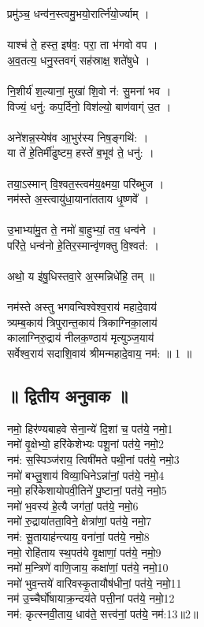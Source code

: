 प्रमु॑ञ्च॒ धन्व॑न॒स्त्वमु॒भयो॒रार्त्नि॑यो॒र्ज्याम् ।\\
\\
याश्च॑ ते॒ हस्त॒ इष॑व॒: परा॒ ता भ॑गवो वप ।\\
अ॒व॒तत्य॒ धनु॒स्तवग्ं सह॑स्राक्ष॒ शते॑षुधे ।\\
\\
नि॒शीर्य॑ श॒ल्यानां॒ मुखा॑ शि॒वो न॑: सु॒मना॑ भव ।\\
विज्यं॒ धनु॑: कप॒र्दिनो॒ विश॑ल्यो॒ बाण॑वाग्ं उ॒त ।\\
\\
अने॑शन्न॒स्येष॑व आ॒भुर॑स्य निष॒ङ्गथि॑: ।\\
या ते॑ हे॒तिर्मी॑ढुष्टम॒ हस्ते॑ ब॒भूव॑ ते॒ धनु॑: ।\\
\\
तया॒ऽस्मान् वि॒श्वत॒स्त्वम॑य॒क्ष्मया॒ परि॑ब्भुज ।\\
नम॑स्ते अ॒स्त्वायु॑धा॒याना॑तताय धृ॒ष्णवे᳚ ।\\
\\
उ॒भाभ्या॑मु॒त ते॒ नमो॑ बा॒हुभ्यां॒ तव॒ धन्व॑ने ।\\
परि॑ते॒ धन्व॑नो हे॒तिर॒स्मान्वृ॑णक्तु वि॒श्वत॑: ।\\
\\
अथो॒ य इ॑षु॒धिस्तवा॒रे अ॒स्मन्निधे॑हि॒ तम् ॥\\
\\
नम॑स्ते अस्तु भगवन्विश्वेश्व॒राय॑ महादे॒वाय॑\\
त्र्यम्ब॒काय॑ त्रिपुरान्त॒काय॑ त्रिकाग्निका॒लाय॑\\
कालाग्निरु॒द्राय॑ नीलक॒ण्ठाय॑ मृत्युञ्ज॒याय॑\\
सर्वेश्व॒राय॑ सदाशि॒वाय॑ श्रीमन्महादे॒वाय॒ नम॑: ॥ 1 ॥\\
\subsection{॥ द्वितीय अनुवाक ॥}
नमो॒ हिर॑ण्यबाहवे सेना॒न्ये॑ दि॒शां च॒ पत॑ये॒ नमो॒{\small 1}\\
नमो॑ वृ॒क्षेभ्यो॒ हरि॑केशेभ्यः पशू॒नां पत॑ये॒ नमो॒{\small 2}\\
नम॑: स॒स्पिञ्ज॑राय॒ त्विषी॑मते पथी॒नां पत॑ये॒ नमो॒{\small 3}\\
नमो॑ बभ्लु॒शाय॑ विव्या॒धिनेऽन्ना॑नां॒ पत॑ये॒ नमो॒{\small 4}\\
नमो॒ हरि॑केशायोपवी॒तिने॑ पु॒ष्टानां॒ पत॑ये॒ नमो॒{\small 5}\\
नमो॑ भ॒वस्य॑ हे॒त्यै जग॑तां॒ पत॑ये॒ नमो॒{\small 6}\\
नमो॑ रु॒द्राया॑तता॒विने॒ क्षेत्रा॑णां॒ पत॑ये॒ नमो॒{\small 7}\\
नम॑: सू॒तायाह॑न्त्याय॒ वना॑नां॒ पत॑ये॒ नमो॒{\small 8}\\
नमो॒ रोहि॑ताय स्थ॒पत॑ये वृ॒क्षाणां॒ पत॑ये॒ नमो॒{\small 9}\\
नमो॑ म॒न्त्रिणे॑ वाणि॒जाय॒ कक्षा॑णां॒ पत॑ये॒ नमो॒{\small 10}\\
नमो॑ भुव॒न्तये॑ वारिवस्कृ॒तायौष॑धीनां॒ पत॑ये॒ नमो॒{\small 11}\\
नम॑ उ॒च्चैर्घो॑षायाक्र॒न्दय॑ते पत्ती॒नां पत॑ये॒ नमो॒{\small 12}\\
नम॑: कृत्स्नवी॒ताय॒ धाव॑ते॒ सत्त्व॑नां॒ पत॑ये॒ नम॑:{\small 13}॥2॥\\
